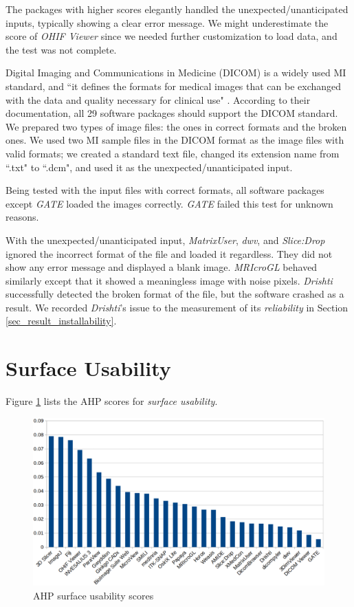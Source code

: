 The packages with higher scores elegantly handled the unexpected/unanticipated inputs, typically showing a clear error message. We might underestimate the score of \textit{OHIF Viewer} since we needed further customization to load data, and the test was not complete.

Digital Imaging and Communications in Medicine (DICOM) is a widely used MI standard, and ``it defines the formats for medical images that can be exchanged with the data and quality necessary for clinical use" \cite{MITA2021}. According to their documentation, all 29 software packages should support the DICOM standard. We prepared two types of image files: the ones in correct formats and the broken ones. We used two MI sample files in the DICOM format as the image files with valid formats; we created a standard text file, changed its extension name from ``.txt" to ``.dcm", and used it as the unexpected/unanticipated input.

Being tested with the input files with correct formats, all software packages except \textit{GATE} loaded the images correctly. \textit{GATE} failed this test for unknown reasons.

With the unexpected/unanticipated input, \textit{MatrixUser}, \textit{dwv}, and \textit{Slice:Drop} ignored the incorrect format of the file and loaded it regardless. They did not show any error message and displayed a blank image. \textit{MRIcroGL} behaved similarly except that it showed a meaningless image with noise pixels. \textit{Drishti} successfully detected the broken format of the file, but the software crashed as a result. We recorded \textit{Drishti}'s issue to the measurement of its \textit{reliability} in Section \ref{sec_result_installability}.

\section{Surface Usability}
Figure \ref{fg_usability_scores} lists the AHP scores for \textit{surface usability}.

\begin{figure}[H]
\includegraphics[scale=0.38]{figures/usability_scores.png}
\caption{AHP surface usability scores}
\label{fg_usability_scores}
\end{figure}

